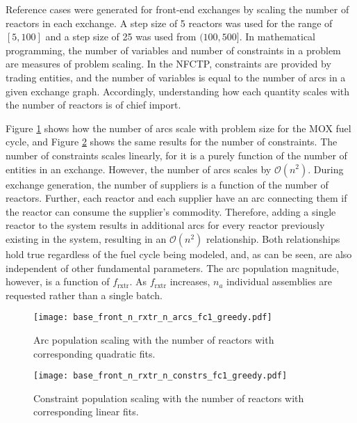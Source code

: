 Reference cases were generated for front-end exchanges by scaling the number of
reactors in each exchange. A step size of 5 reactors was used for the range of
$[5, 100]$ and a step size of 25 was used from $(100, 500]$. In mathematical
  programming, the number of variables and number of constraints in a problem
  are measures of problem scaling. In the NFCTP, constraints are provided by
  trading entities, and the number of variables is equal to the number of arcs
  in a given exchange graph. Accordingly, understanding how each quantity scales
  with the number of reactors is of chief import.

Figure \ref{fig:base_front_n_rxtr_n_arcs_fc1_greedy} shows how the number
of arcs scale with problem size for the MOX fuel cycle, and Figure
\ref{fig:base_front_n_rxtr_n_constrs_fc1_greedy} shows the same results
for the number of constraints. The number of constraints scales linearly, for it
is a purely function of the number of entities in an exchange. However, the
number of arcs scales by $\mathcal{O}(n^2)$. During exchange generation, the
number of suppliers is a function of the number of reactors. Further, each
reactor and each supplier have an arc connecting them if the reactor can consume
the supplier's commodity. Therefore, adding a single reactor to the system
results in additional arcs for every reactor previously existing in the system,
resulting in an $\mathcal{O}(n^2)$ relationship. Both relationships hold true
regardless of the fuel cycle being modeled, and, as can be seen, are also
independent of other fundamental parameters. The arc population magnitude,
however, is a function of $f_\text{rxtr}$. As $f_\text{rxtr}$ increases, $n_a$
individual assemblies are requested rather than a single batch.

\begin{figure}[h!]
  \begin{center}
    \texttt{[image: base\_front\_n\_rxtr\_n\_arcs\_fc1\_greedy.pdf]}
    \caption[]{
      \label{fig:base_front_n_rxtr_n_arcs_fc1_greedy}
      Arc population scaling with the number of reactors with corresponding
      quadratic fits.}
  \end{center}
\end{figure}

\begin{figure}[h!]
  \begin{center}
    \texttt{[image: base\_front\_n\_rxtr\_n\_constrs\_fc1\_greedy.pdf]}
    \caption[]{
      \label{fig:base_front_n_rxtr_n_constrs_fc1_greedy}
      Constraint population scaling with the number of reactors with
      corresponding linear fits.}
  \end{center}
\end{figure}

